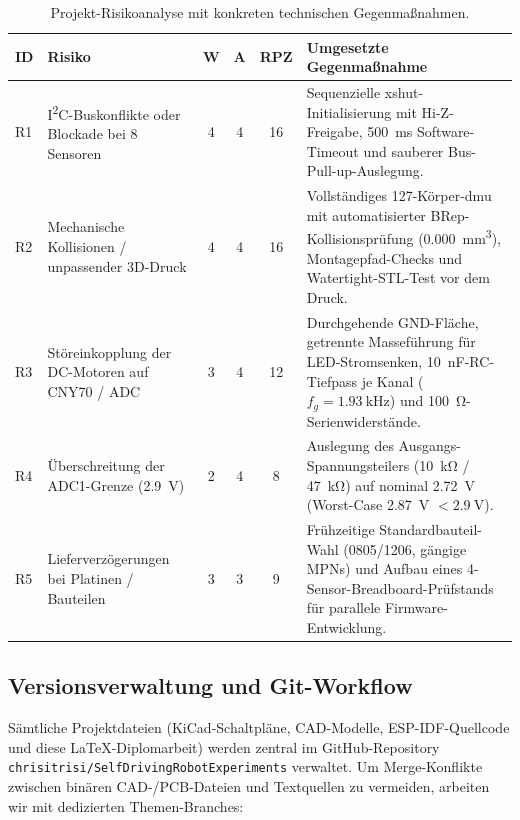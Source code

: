 \begin{table}[htbp]
\centering
\caption{Projekt-Risikoanalyse mit konkreten technischen Gegenmaßnahmen.}
\label{tab:risiko}
\begin{tabular}{@{}p{0.9cm}p{3.4cm}ccc p{7.0cm}@{}}
\toprule
\textbf{ID} & \textbf{Risiko} & \textbf{W} & \textbf{A} & \textbf{RPZ} & \textbf{Umgesetzte Gegenmaßnahme} \\
\midrule
R1 & I\textsuperscript{2}C-Buskonflikte oder Blockade bei 8 Sensoren & 4 & 4 & 16 & Sequenzielle \gls{xshut}-Initialisierung mit Hi-Z-Freigabe, \qty{500}{\milli\second} Software-Timeout und sauberer Bus-Pull-up-Auslegung. \\
R2 & Mechanische Kollisionen / unpassender 3D-Druck & 4 & 4 & 16 & Vollständiges 127-Körper-\gls{dmu} mit automatisierter BRep-Kollisionsprüfung (\qty{0,000}{\milli\meter\cubed}), Montagepfad-Checks und Watertight-STL-Test vor dem Druck. \\
R3 & Störeinkopplung der DC-Motoren auf CNY70 / ADC & 3 & 4 & 12 & Durchgehende GND-Fläche, getrennte Masseführung für LED-Stromsenken, \qty{10}{\nano\farad}-RC-Tiefpass je Kanal ($f_g = \qty{1,93}{\kilo\hertz}$) und \qty{100}{\ohm}-Serienwiderstände. \\
R4 & Überschreitung der ADC1-Grenze (\qty{2,9}{\volt}) & 2 & 4 & 8 & Auslegung des Ausgangs-Spannungsteilers (\qty{10}{\kilo\ohm} / \qty{47}{\kilo\ohm}) auf nominal \qty{2,72}{\volt} (Worst-Case \qty{2,87}{\volt} $< \qty{2,9}{\volt}$). \\
R5 & Lieferverzögerungen bei Platinen / Bauteilen & 3 & 3 & 9 & Frühzeitige Standardbauteil-Wahl (0805/1206, gängige MPNs) und Aufbau eines 4-Sensor-Breadboard-Prüfstands für parallele Firmware-Entwicklung. \\
\bottomrule
\end{tabular}
\end{table}

\subsection{Versionsverwaltung und Git-Workflow}
Sämtliche Projektdateien (KiCad-Schaltpläne, CAD-Modelle, ESP-IDF-Quellcode und diese LaTeX-Diplomarbeit) werden zentral im GitHub-Repository \texttt{chrisitrisi/SelfDrivingRobotExperiments} verwaltet. Um Merge-Konflikte zwischen binären CAD-/PCB-Dateien und Textquellen zu vermeiden, arbeiten wir mit dedizierten Themen-Branches:


